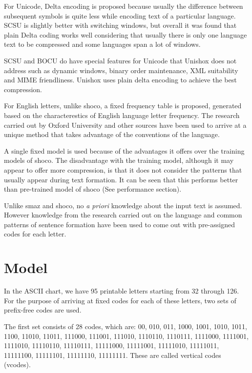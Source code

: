 \documentclass[]{article}
\begin{document}
	For Unicode, Delta encoding is proposed because usually the difference between subsequent symbols is quite less while encoding text of a particular language. SCSU is slightly better with switching windows, but overall it was found that plain Delta coding works well considering that usually there is only one language text to be compressed and some languages span a lot of windows.
	
	SCSU and BOCU do have special features for Unicode that Unishox does not address such as dynamic windows, binary order maintenance, XML suitability and MIME friendliness. Unishox uses plain delta encoding to achieve the best compression.
	
	For English letters, unlike shoco, a fixed frequency table is proposed, generated based on the characterestics of English language letter frequency. The research carried out by Oxford University \cite{7} and other sources \cite{7} \cite{9} have been used to arrive at a unique method that takes advantage of the conventions of the language.
	
	A single fixed model is used because of the advantages it offers over the training models of shoco. The disadvantage with the training model, although it may appear to offer more compression, is that it does not consider the patterns that usually appear during text formation. It can be seen that this performs better than pre-trained model of shoco (See performance section).
	
	Unlike smaz and shoco, no \emph{a priori} knowledge about the input text is assumed. However knowledge from the research carried out on the language and common patterns of sentence formation have been used to come out with pre-assigned codes for each letter.
	
	\section{Model}
	
	In the ASCII chart, we have 95 printable letters starting from 32 through 126. For the purpose of arriving at fixed codes for each of these letters, two sets of prefix-free codes are used.
	
	The first set consists of 28 codes, which are: 00, 010, 011, 1000, 1001, 1010, 1011, 1100, 11010, 11011, 111000, 111001, 111010, 1110110, 1110111, 1111000, 1111001, 1111010, 11110110, 11110111, 11111000, 11111001, 11111010, 11111011, 11111100, 11111101, 11111110, 11111111. These are called vertical codes (vcodes).
	
\end{document}
